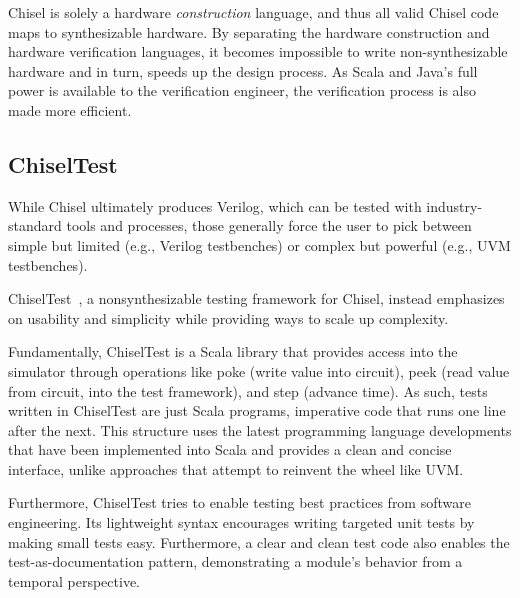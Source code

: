 \documentclass[conference]{IEEEtran}
\newcommand{\martin}[1]{{\color{blue} Martin: #1}}
\newcommand{\kasper}[1]{{\color{purple} Kasper: #1}}
\renewcommand{\martin}[1]{}
\renewcommand{\kasper}[1]{}
\begin{document}
\kasper{I don't quite understand this one - I don't see any Scala code in the directory. Is it the Java code in noc/src ?}
\martin{Maybe I should drop this, as the Scala code is in a different repo.}

Chisel is solely a hardware \emph{construction} language, and thus all valid Chisel code
maps to synthesizable hardware.
By separating the hardware construction and hardware verification languages,
it becomes impossible to write non-synthesizable hardware and in turn, speeds up the design process.
As Scala and Java's full power is available to the verification engineer,
the verification process is also made more efficient.


\martin{This is just a starting point, way more is needed.}
\kasper{Maybe take some of the points from the Introduction and move them here? We don't have that much space though, so I think it's fine.}

\subsection{ChiselTest}

While Chisel ultimately produces Verilog, which can be tested with industry-standard tools and processes, those generally force the user to pick between simple but limited (e.g., Verilog testbenches) or complex but powerful (e.g., UVM testbenches).

ChiselTest~\cite{chisel:tester2}, a nonsynthesizable testing framework for Chisel, instead emphasizes on usability and simplicity while providing ways to scale up complexity.

Fundamentally, ChiselTest is a Scala library that provides access into the simulator through operations like poke (write value into circuit), peek (read value from circuit, into the test framework), and step (advance time).
As such, tests written in ChiselTest are just Scala programs, imperative code that runs one line after the next.
This structure uses the latest programming language developments that have been implemented into Scala and provides a clean and concise interface, unlike approaches that attempt to reinvent the wheel like UVM.

Furthermore, ChiselTest tries to enable testing best practices from software engineering.
Its lightweight syntax encourages writing targeted unit tests by making small tests easy.
Furthermore, a clear and clean test code also enables the test-as-documentation pattern,
demonstrating a module's behavior from a temporal perspective.
\end{document}
